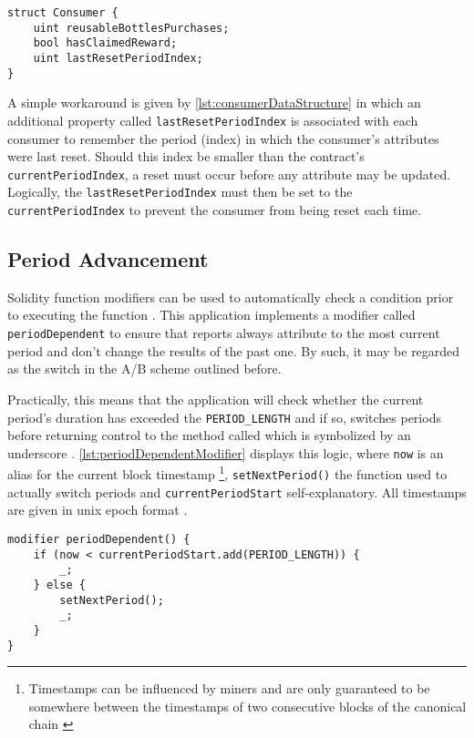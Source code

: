\begin{lstlisting}[language=Solidity, caption=Consumer data structure, label=lst:consumerDataStructure]
struct Consumer {
	uint reusableBottlesPurchases;
	bool hasClaimedReward;
	uint lastResetPeriodIndex;
}
\end{lstlisting}

A simple workaround is given by \autoref{lst:consumerDataStructure} in which an additional property called \texttt{lastResetPeriodIndex} is associated with each consumer to remember the period (index) in which the consumer's attributes were last reset. Should this index be smaller than the contract's \texttt{currentPeriodIndex}, a reset must occur before any attribute may be updated. Logically, the \texttt{lastResetPeriodIndex} must then be set to the \texttt{currentPeriodIndex} to prevent the consumer from being reset each time.

\subsection{Period Advancement}
Solidity function modifiers can be used to automatically check a condition prior to executing the function \cite[p.~79]{solidityDocs}. This application implements a modifier called \texttt{periodDependent} to ensure that reports always attribute to the most current period and don't change the results of the past one. By such, it may be regarded as the switch in the A/B scheme outlined before.

Practically, this means that the application will check whether the current period's duration has exceeded the \texttt{PERIOD\_LENGTH} and if so, switches periods before returning control to the method called which is symbolized by an underscore \cite[p.~81]{solidityDocs}. \autoref{lst:periodDependentModifier} displays this logic, where \texttt{now} is an alias for the current block timestamp \footnote{Timestamps can be influenced by miners and are only guaranteed to be somewhere between the timestamps of two consecutive blocks of the canonical chain \cite[p.~65]{solidityDocs}}, \texttt{setNextPeriod()} the function used to actually switch periods and \texttt{currentPeriodStart} self-explanatory. All timestamps are given in unix epoch format \cite[p.~29]{solidityDocs}. 

\begin{lstlisting}[language=Solidity, caption=Function modifier to advance period, label=lst:periodDependentModifier]
modifier periodDependent() {	
	if (now < currentPeriodStart.add(PERIOD_LENGTH)) {
	    _;
	} else {
	    setNextPeriod();
	    _;
	}
}
\end{lstlisting}

